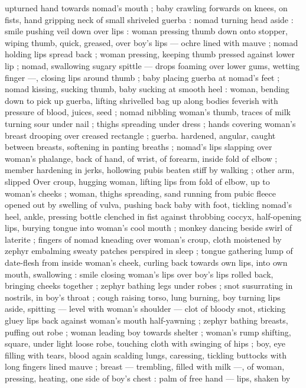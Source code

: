 upturned hand towards nomad's mouth ; baby crawling forwards on 
knees, on fists, hand gripping neck of small shriveled guerba : 
nomad turning head aside : smile pushing veil down over lips : 
woman pressing thumb down onto stopper, wiping thumb, quick, 
greased, over boy's lips --- ochre lined with mauve ; nomad holding 
lips spread back ; woman pressing, keeping thumb pressed against 
lower lip ; nomad, swallowing sugary spittle --- drops foaming over 
lower gums, wetting finger ---, closing lips around thumb ; baby 
placing guerba at nomad's feet ; nomad kissing, sucking thumb, baby 
sucking at smooth heel : woman, bending down to pick up guerba, 
lifting shrivelled bag up along bodies feverish with pressure of 
blood, juices, seed ; nomad nibbling woman's thumb, traces of milk 
turning sour under nail ; thighs spreading under dress ; hands 
covering woman's breast drooping over creased rectangle ; guerba. 
hardened, angular, caught between breasts, softening in panting 
breaths ; nomad's lips slapping over woman's phalange, back of 
hand, of wrist, of forearm, inside fold of elbow ; member hardening 
in jerks, hollowing pubis beaten stiff by walking ; other arm, slipped 
Over croup, hugging woman, lifting lips from fold of elbow, up to 
woman's cheeks ; woman, thighs spreading, sand running from pubic 
fleece opened out by swelling of vulva, pushing back baby with foot, 
tickling nomad's heel, ankle, pressing bottle clenched in fist against 
throbbing coccyx, half-opening lips, burying tongue into woman's 
cool mouth ; monkey dancing beside swirl of laterite ; fingers of 
nomad kneading over woman's croup, cloth moistened by zephyr 
embalming sweaty patches perspired in sleep ; tongue gathering 
lump of date-flesh from inside woman's cheek, curling back towards 
own lips, into own mouth, swallowing : smile closing woman's lips 
over boy's lips rolled back, bringing cheeks together ; zephyr bathing 
legs under robes ; snot susurrating in nostrils, in boy's throat ; cough 
raising torso, lung burning, boy turning lips aside, spitting --- level 
with woman's shoulder --- clot of bloody snot, sticking gluey lips 
back against woman's mouth half-yawning ; zephyr bathing breasts, 
puffing out robe ; woman leading boy towards shelter ; woman's 
rump shifting, square, under light loose robe, touching cloth with 
swinging of hips ; boy, eye filling with tears, blood again scalding 
lungs, caressing, tickling buttocks with long fingers lined mauve ; 
breast --- trembling, filled with milk ---, of woman, pressing, heating, 
one side of boy's chest : palm of free hand --- lips, shaken by 

